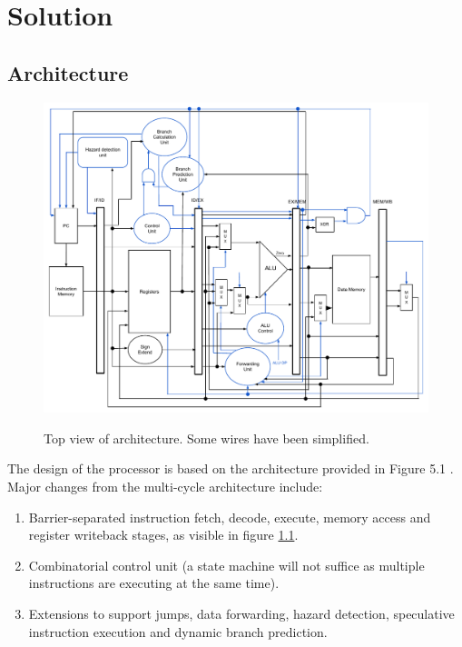 \chapter{Solution}


\section{Architecture}

\begin{figure}[ht!]
    \begin{center}
        \includegraphics[width=\textwidth]{assets/RTL.pdf}
        \label{fig:architecture}
        \caption{Top view of architecture. Some wires have been simplified.}
    \end{center}
\end{figure}

The design of the processor is based on the architecture provided in Figure 5.1 \cite[p. 50]{compendium}.
Major changes from the multi-cycle architecture include:

\begin{enumerate}
  \item
    Barrier-separated instruction fetch, decode, execute, memory access and register writeback stages, as visible in figure \ref{fig:architecture}.
  \item
    Combinatorial control unit (a state machine will not suffice as multiple instructions are executing at the same time).
  \item
    Extensions to support jumps, data forwarding, hazard detection, speculative instruction execution and dynamic branch prediction.
\end{enumerate}

